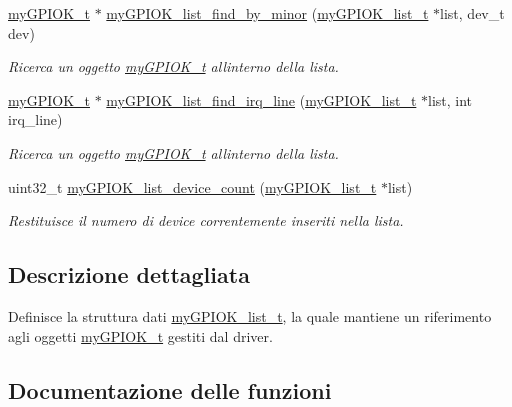 \begin{DoxyCompactItemize}
\hyperlink{structmy_g_p_i_o_k__t}{my\+G\+P\+I\+O\+K\+\_\+t} $\ast$ \hyperlink{group___device_list_gaf50b0da291040e8da5050194a4979849}{my\+G\+P\+I\+O\+K\+\_\+list\+\_\+find\+\_\+by\+\_\+minor} (\hyperlink{structmy_g_p_i_o_k__list__t}{my\+G\+P\+I\+O\+K\+\_\+list\+\_\+t} $\ast$list, dev\+\_\+t dev)
\begin{DoxyCompactList}\small\item\em Ricerca un oggetto \hyperlink{structmy_g_p_i_o_k__t}{my\+G\+P\+I\+O\+K\+\_\+t} all\textquotesingle{}interno della lista. \end{DoxyCompactList}\item 
\hyperlink{structmy_g_p_i_o_k__t}{my\+G\+P\+I\+O\+K\+\_\+t} $\ast$ \hyperlink{group___device_list_ga0bb70e18f51367d95fa28f723679ac30}{my\+G\+P\+I\+O\+K\+\_\+list\+\_\+find\+\_\+irq\+\_\+line} (\hyperlink{structmy_g_p_i_o_k__list__t}{my\+G\+P\+I\+O\+K\+\_\+list\+\_\+t} $\ast$list, int irq\+\_\+line)
\begin{DoxyCompactList}\small\item\em Ricerca un oggetto \hyperlink{structmy_g_p_i_o_k__t}{my\+G\+P\+I\+O\+K\+\_\+t} all\textquotesingle{}interno della lista. \end{DoxyCompactList}\item 
uint32\+\_\+t \hyperlink{group___device_list_ga731d5b5cbb96c6c5ef53936c23cdc58a}{my\+G\+P\+I\+O\+K\+\_\+list\+\_\+device\+\_\+count} (\hyperlink{structmy_g_p_i_o_k__list__t}{my\+G\+P\+I\+O\+K\+\_\+list\+\_\+t} $\ast$list)
\begin{DoxyCompactList}\small\item\em Restituisce il numero di device correntemente inseriti nella lista. \end{DoxyCompactList}\end{DoxyCompactItemize}


\subsection{Descrizione dettagliata}
Definisce la struttura dati \hyperlink{structmy_g_p_i_o_k__list__t}{my\+G\+P\+I\+O\+K\+\_\+list\+\_\+t}, la quale mantiene un riferimento agli oggetti \hyperlink{structmy_g_p_i_o_k__t}{my\+G\+P\+I\+O\+K\+\_\+t} gestiti dal driver. 



\subsection{Documentazione delle funzioni}
\mbox{\label{group___device_list_gac5048cf2dbbbce3c39485e15595e88c9}} 
